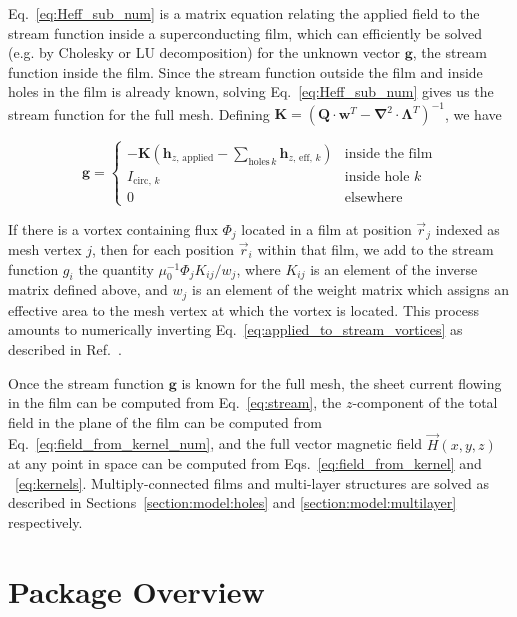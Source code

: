 \documentclass[final,3p,times]{elsarticle}
\newcounter{bla}
\begin{document}
Eq.~\ref{eq:Heff_sub_num} is a matrix equation relating the applied field to the stream function
inside a superconducting film, which can efficiently be solved (e.g. by Cholesky or LU decomposition) for the unknown vector $\mathbf{g}$, the stream function inside the film. Since the stream function outside the film and inside holes in the film is already known, solving Eq.~\ref{eq:Heff_sub_num} gives us the stream function for the full mesh. Defining $\mathbf{K} = \left(\mathbf{Q}\cdot\mathbf{w}^T-\mathbf{\nabla}^2\cdot\mathbf{\Lambda}^T\right)^{-1}$, we have

\begin{equation}
    \label{eq:full_stream}
    \mathbf{g} = \begin{cases}
        -\mathbf{K}
        \left(\mathbf{h}_{z,\,\mathrm{applied}} - \sum_{\mathrm{holes}\,k}\mathbf{h}_{z,\,\mathrm{eff},\,k}\right)
            & \text{inside the film}\\
        I_{\mathrm{circ},\,k}
            & \text{inside hole }k\\
        0
            & \text{elsewhere}
    \end{cases}
\end{equation}

If there is a vortex containing flux $\Phi_j$ located in a film at position $\vec{r}_j$ indexed as mesh vertex $j$, then for each position $\vec{r}_i$ within that film, we add to the stream function $g_i$ the quantity $\mu_0^{-1}\Phi_jK_{ij} / w_{j}$, where $K_{ij}$ is an element of the inverse matrix defined above, and $w_{j}$ is an element of the weight matrix which assigns an effective area to the mesh vertex at which the vortex is located. This process amounts to numerically inverting Eq.~\ref{eq:applied_to_stream_vortices} as described in Ref.~\cite{Brandt2005-wj}.

Once the stream function $\mathbf{g}$ is known for the full mesh,
the sheet current flowing in the film can be computed from Eq.~\ref{eq:stream}, the $z$-component of the total field in the plane of the film can be computed
from Eq.~\ref{eq:field_from_kernel_num}, and the full vector magnetic field $\vec{H}(x, y, z)$
at any point in space can be computed from Eqs.~\ref{eq:field_from_kernel} and ~\ref{eq:kernels}. Multiply-connected films and multi-layer structures are solved as described in Sections~\ref{section:model:holes} and \ref{section:model:multilayer} respectively.

\section{Package Overview}
\label{section:overview}
\end{document}
